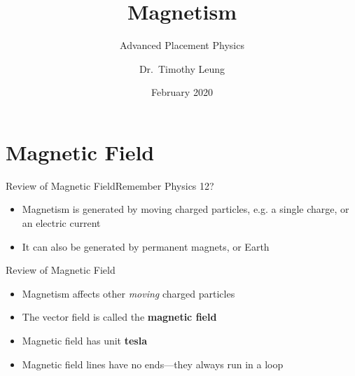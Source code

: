 \documentclass[12pt,aspectratio=169]{beamer}
\title{Magnetism}
\subtitle{Advanced Placement Physics}
\author[TML]{Dr.\ Timothy Leung}
\institute{Olympiads School, Toronto, ON, Canada}
\date{February 2020}
\begin{document}
\begin{frame}
  \maketitle
\end{frame}


%
%



\section{Magnetic Field}

\begin{frame}{Review of Magnetic Field}{Remember Physics 12?}
  \begin{itemize}
  \item Magnetism is generated by moving charged particles, e.g.
    a single charge, or an electric current
  \item It can also be generated by permanent magnets, or Earth
  \end{itemize}
\end{frame}



\begin{frame}{Review of Magnetic Field}
  \begin{itemize}
  \item Magnetism affects other \emph{moving} charged particles
  \item The vector field is called the \textbf{magnetic field}
  \item Magnetic field has unit \textbf{tesla}
  \item Magnetic field lines have no ends---they always run in a loop
  \end{itemize}
\end{frame}
\end{document}
